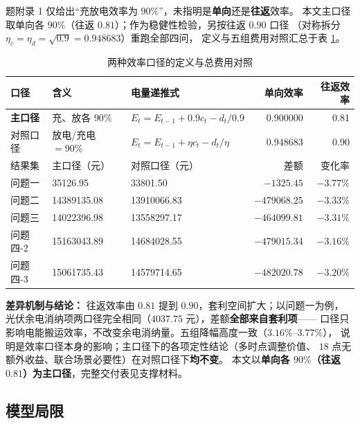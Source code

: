 题附录 1 仅给出“充放电效率为 $90\%$”，未指明是\textbf{单向}还是\textbf{往返}效率。
本文主口径取单向各 $90\%$（往返 $0.81$）；作为稳健性检验，另按往返 $0.90$ 口径
（对称拆分 $\eta_c=\eta_d=\sqrt{0.9}=0.948683$）重跑全部四问，
定义与五组费用对照汇总于表 \ref{tab:eff}。

\begin{table}[htbp]
\centering
\caption{两种效率口径的定义与总费用对照}
\label{tab:eff}
\small
\setlength{\tabcolsep}{4pt}
\begin{tabular}{@{}l l l r r@{}}
\toprule
口径 & 含义 & 电量递推式 & 单向效率 & 往返效率 \\
\midrule
\textbf{主口径} & 充、放各 $90\%$ & $E_t=E_{t-1}+0.9c_t-d_t/0.9$ & 0.900000 & 0.81 \\
对照口径 & 放电/充电 $=90\%$ & $E_t=E_{t-1}+\eta c_t-d_t/\eta$ & 0.948683 & 0.90 \\
\midrule
结果集 & {主口径（元）} & {对照口径（元）} & 差额 & 变化率 \\
\midrule
问题一   & 35126.95    & 33801.50     & $-1325.45$   & $-3.77\%$ \\
问题二   & 14389135.08 & 13910066.83  & $-479068.25$ & $-3.33\%$ \\
问题三   & 14022396.98 & 13558297.17  & $-464099.81$ & $-3.31\%$ \\
问题四-2 & 15163043.89 & 14684028.55  & $-479015.34$ & $-3.16\%$ \\
问题四-3 & 15061735.43 & 14579714.65  & $-482020.78$ & $-3.20\%$ \\
\bottomrule
\end{tabular}
\end{table}

\textbf{差异机制与结论：} 往返效率由 $0.81$ 提到 $0.90$，套利空间扩大；以问题一为例，
光伏余电消纳项两口径完全相同（$4037.75$ 元），差额\textbf{全部来自套利项}——
口径只影响电能搬运效率，不改变余电消纳量。五组降幅高度一致（$3.16\%$--$3.77\%$），
说明是效率口径本身的影响；主口径下的各项定性结论（多时点调整价值、
$18$ 点无额外收益、联合场景必要性）在对照口径下\textbf{均不变}。
本文以\textbf{单向各 $90\%$（往返 $0.81$）为主口径}，完整交付表见支撑材料。

\subsection{模型局限}
\label{sec:limits}

